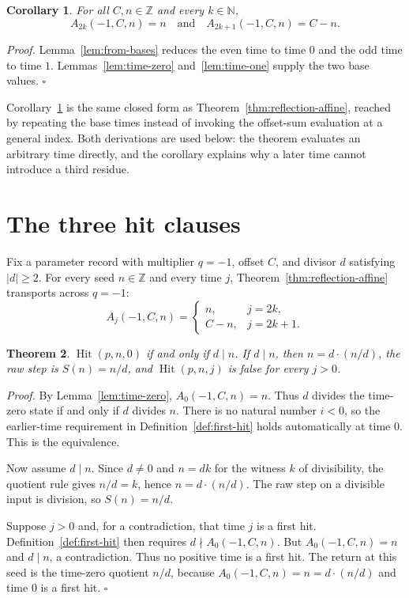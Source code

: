 \documentclass[11pt,letterpaper]{article}
\newcommand{\N}{\mathbb{N}}
\newcommand{\Z}{\mathbb{Z}}
\newtheorem{theorem}{Theorem}
\newtheorem{corollary}[theorem]{Corollary}
\newenvironment{proof}{\noindent\textit{Proof.}}{\hfill\(\square\)}
\begin{document}
\begin{corollary}
\label{cor:by-repeat}
For all \(C,n\in\Z\) and every \(k\in\N\),
\[
A_{2k}(-1,C,n)=n
\quad\text{and}\quad
A_{2k+1}(-1,C,n)=C-n.
\]
\end{corollary}

\begin{proof}
Lemma~\ref{lem:from-bases} reduces the even time to time \(0\) and the odd
time to time \(1\). Lemmas~\ref{lem:time-zero} and~\ref{lem:time-one} supply
the two base values.
\end{proof}

Corollary~\ref{cor:by-repeat} is the same closed form as
Theorem~\ref{thm:reflection-affine}, reached by repeating the base times
instead of invoking the offset-sum evaluation at a general index. Both
derivations are used below: the theorem evaluates an arbitrary time directly,
and the corollary explains why a later time cannot introduce a third residue.

\section{The three hit clauses}

Fix a parameter record with multiplier \(q=-1\), offset \(C\), and divisor
\(d\) satisfying \(|d|\ge 2\). For every seed \(n\in\Z\) and every time \(j\),
Theorem~\ref{thm:reflection-affine} transports across \(q=-1\):
\[
A_j(-1,C,n)=\begin{cases}
n, & j=2k,\\
C-n, & j=2k+1.
\end{cases}
\]

\begin{theorem}
\label{thm:hit-zero}
\(\operatorname{Hit}(p,n,0)\) if and only if \(d\mid n\). If \(d\mid n\), then
\(n=d\cdot(n/d)\), the raw step is \(S(n)=n/d\), and
\(\operatorname{Hit}(p,n,j)\) is false for every \(j>0\).
\end{theorem}

\begin{proof}
By Lemma~\ref{lem:time-zero}, \(A_0(-1,C,n)=n\). Thus \(d\) divides the time-zero
state if and only if \(d\) divides \(n\). There is no natural number \(i<0\),
so the earlier-time requirement in Definition~\ref{def:first-hit} holds
automatically at time \(0\). This is the equivalence.

Now assume \(d\mid n\). Since \(d\neq 0\) and \(n=dk\) for the witness \(k\) of
divisibility, the quotient rule gives \(n/d=k\), hence
\(n=d\cdot(n/d)\). The raw step on a divisible input is division, so
\(S(n)=n/d\).

Suppose \(j>0\) and, for a contradiction, that time \(j\) is a first hit.
Definition~\ref{def:first-hit} then requires \(d\nmid A_0(-1,C,n)\). But
\(A_0(-1,C,n)=n\) and \(d\mid n\), a contradiction. Thus no positive time is a
first hit. The return at this seed is the time-zero quotient \(n/d\), because
\(A_0(-1,C,n)=n=d\cdot(n/d)\) and time \(0\) is a first hit.
\end{proof}
\end{document}
